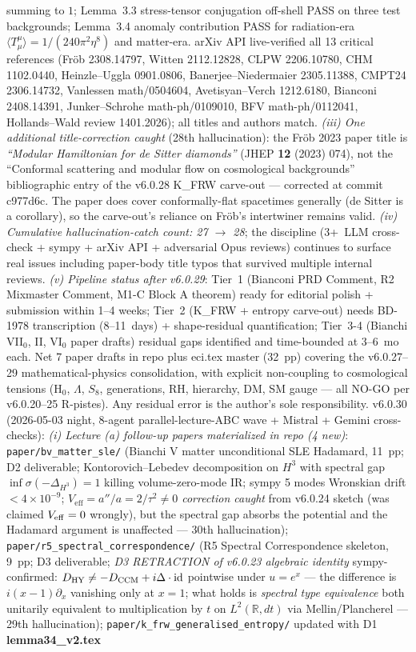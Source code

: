 \documentclass[reprint,amsmath,amssymb,aps,prd,superscriptaddress]{revtex4-2}
\providecommand{\R}{\mathbb{R}}
\providecommand{\1}{\mathbf{1}}
\begin{document}
summing to $1$; Lemma~3.3 stress-tensor conjugation off-shell PASS on three test backgrounds; Lemma~3.4 anomaly contribution PASS for radiation-era $\langle T^\mu_\mu\rangle = 1/(240\pi^2\eta^8)$ and matter-era. arXiv API live-verified all 13 critical references (Fr\"ob 2308.14797, Witten 2112.12828, CLPW 2206.10780, CHM 1102.0440, Heinzle--Uggla 0901.0806, Banerjee--Niedermaier 2305.11388, CMPT24 2306.14732, Vanlessen math/0504604, Avetisyan--Verch 1212.6180, Bianconi 2408.14391, Junker--Schrohe math-ph/0109010, BFV math-ph/0112041, Hollands--Wald review 1401.2026); all titles and authors match. \emph{(iii) One additional title-correction caught} (28th hallucination): the Fr\"ob 2023 paper title is \emph{``Modular Hamiltonian for de Sitter diamonds''} (JHEP \textbf{12} (2023) 074), not the ``Conformal scattering and modular flow on cosmological backgrounds'' bibliographic entry of the v6.0.28 K\_FRW carve-out --- corrected at commit c977d6c. The paper does cover conformally-flat spacetimes generally (de Sitter is a corollary), so the carve-out's reliance on Fr\"ob's intertwiner remains valid. \emph{(iv) Cumulative hallucination-catch count: 27 $\to$ 28}; the discipline (3+~LLM cross-check + sympy + arXiv API + adversarial Opus reviews) continues to surface real issues including paper-body title typos that survived multiple internal reviews. \emph{(v) Pipeline status after v6.0.29}: Tier~1 (Bianconi PRD Comment, R2 Mixmaster Comment, M1-C Block A theorem) ready for editorial polish + submission within 1--4 weeks; Tier~2 (K\_FRW + entropy carve-out) needs BD-1978 transcription (8--11~days) + shape-residual quantification; Tier~3-4 (Bianchi VII$_0$, II, VI$_0$ paper drafts) residual gaps identified and time-bounded at 3--6~mo each. Net 7 paper drafts in repo plus eci.tex master (32~pp) covering the v6.0.27--29 mathematical-physics consolidation, with explicit non-coupling to cosmological tensions (H$_0$, $\Lambda$, $S_8$, generations, RH, hierarchy, DM, SM gauge --- all NO-GO per v6.0.20--25 R-pistes). Any residual error is the author's sole responsibility. v6.0.30 (2026-05-03 night, 8-agent parallel-lecture-ABC wave + Mistral + Gemini cross-checks): \emph{(i) Lecture (a) follow-up papers materialized in repo (4 new)}: \texttt{paper/bv\_matter\_sle/} (Bianchi V matter unconditional SLE Hadamard, 11~pp; D2 deliverable; Kontorovich--Lebedev decomposition on $H^3$ with spectral gap $\inf\sigma(-\Delta_{H^3})=1$ killing volume-zero-mode IR; sympy 5 modes Wronskian drift $<4\times 10^{-9}$; \emph{$V_\mathrm{eff} = a''/a = 2/\tau^2 \neq 0$ correction caught} from v6.0.24 sketch (was claimed $V_{\rm eff}=0$ wrongly), but the spectral gap absorbs the potential and the Hadamard argument is unaffected --- 30th hallucination); \texttt{paper/r5\_spectral\_correspondence/} (R5 Spectral Correspondence skeleton, 9~pp; D3 deliverable; \emph{D3 RETRACTION of v6.0.23 algebraic identity} sympy-confirmed: $D_{\rm HY} \neq -D_{\rm CCM} + i\Delta\cdot\mathrm{id}$ pointwise under $u=e^x$ --- the difference is $i(x-1)\partial_x$ vanishing only at $x=1$; what holds is \emph{spectral type equivalence} both unitarily equivalent to multiplication by $t$ on $L^2(\R, dt)$ via Mellin/Plancherel --- 29th hallucination); \texttt{paper/k\_frw\_generalised\_entropy/} updated with D1 \textbf{lemma34\_v2.tex} 
\end{document}

